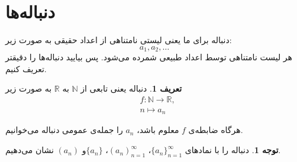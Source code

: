 \documentclass[12pt,a4paper]{article}
\theoremstyle{definition}
\newtheorem{tav}[thm]{توجه}
\newtheorem{defn}[thm]{تعریف}
\begin{document}
\section*{دنباله‌ها}
دنباله برای ما یعنی لیستی نامتناهی از اعداد حقیقی به صورت زیر:
\[
a_1,a_2,\ldots
\]
هر لیست نامتناهی توسط اعداد طبیعی شمرده می‌شود. پس بیایید دنباله‌ها را دقیقتر تعریف کنیم.
\begin{defn}
دنباله یعنی تابعی از 
$\mathbb{N}$
به
$\mathbb{R}$
به صورت زیر
\begin{align*}
&
f: \mathbb{N} \to \mathbb{R}, 
\\
&
n\mapsto a_n
\end{align*}
\end{defn}
هرگاه ضابطه‌ی 
$f$
معلوم باشد، 
$a_n$
 را جمله‌ی عمومی دنباله می‌خوانیم.
\begin{tav}
دنباله را با نمادهای 
$\{ a_n \}^\infty_{n=1}$،
$(a_n)^\infty_{n=1}$،
$\{ a_n \}$و
$(a_n)$
نشان می‌دهیم.
\end{tav}
\end{document}
